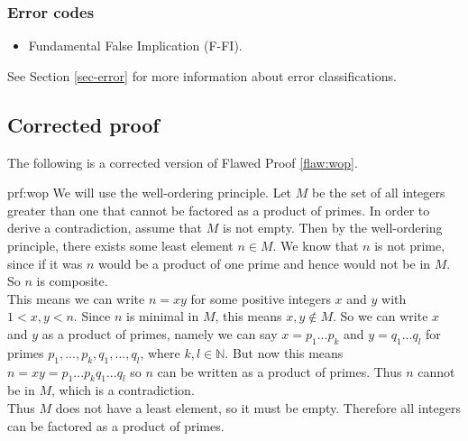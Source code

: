 \subsubsection{Error codes}
\begin{itemize}
	\item 	Fundamental False Implication (F-FI).
\end{itemize}
See Section \ref{sec-error} for more information about error classifications.

\clearpage
\subsection{Corrected proof}

The following is a corrected version of Flawed Proof \ref{flaw:wop}. %

\begin{prf}{prf:wop} %
We will use the well-ordering principle. Let $M$ be the set of all integers greater than one that cannot be factored as a product of primes. In order to derive a contradiction, assume that $M$ is not empty. Then by the well-ordering principle, there exists some least element $n \in M$. We know that $n$ is not prime, since if it was $n$ would be a product of one prime and hence would not be in $M$. So $n$ is composite. \\

This means we can write $n = xy$ for some positive integers $x$ and $y$ with $1 < x,y < n$. Since $n$ is minimal in $M$, this means $x,y \notin M$. So we can write $x$ and $y$ as a product of primes, namely we can say $x = p_1...p_k$ and $y = q_1...q_l$ for primes $p_1,...,p_k,q_1,...,q_l$, where $k,l \in \mathbb{N}$. But now this means $n = xy = p_1...p_kq_1...q_l$ so $n$ can be written as a product of primes. Thus $n $ cannot be in $M$, which is a contradiction. \\

Thus $M$ does not have a least element, so it must be empty. Therefore all integers can be factored as a product of primes.

\end{prf} 